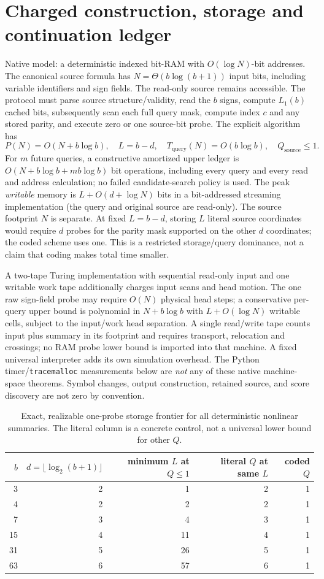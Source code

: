 \documentclass[10pt]{article}
\begin{document}
\section{Charged construction, storage and continuation ledger}
Native model: a deterministic indexed bit-RAM with $O(\log N)$-bit addresses. The canonical source formula has $N=\Theta(b\log(b+1))$ input bits, including variable identifiers and sign fields. The read-only source remains accessible. The protocol must parse source structure/validity, read the $b$ signs, compute $L_1(b)$ cached bits, subsequently scan each full query mask, compute index $c$ and any stored parity, and execute zero or one source-bit probe. The explicit algorithm has
\[
P(N)=O(N+b\log b),\quad L=b-d,\quad
T_{\mathrm{query}}(N)=O(b\log b),\quad Q_{\mathrm{source}}\le1.
\]
For $m$ future queries, a constructive amortized upper ledger is $O(N+b\log b+mb\log b)$ bit operations, including every query and every read and address calculation; no failed candidate-search policy is used. The peak \emph{writable} memory is $L+O(d+\log N)$ bits in a bit-addressed streaming implementation (the query and original source are read-only). The source footprint $N$ is separate. At fixed $L=b-d$, storing $L$ literal source coordinates would require $d$ probes for the parity mask supported on the other $d$ coordinates; the coded scheme uses one. This is a restricted storage/query dominance, not a claim that coding makes total time smaller.

A two-tape Turing implementation with sequential read-only input and one writable work tape additionally charges input scans and head motion. The one raw sign-field probe may require $O(N)$ physical head steps; a conservative per-query upper bound is polynomial in $N+b\log b$ with $L+O(\log N)$ writable cells, subject to the input/work head separation. A single read/write tape counts input plus summary in its footprint and requires transport, relocation and crossings; no RAM probe lower bound is imported into that machine. A fixed universal interpreter adds its own simulation overhead. The Python timer/\texttt{tracemalloc} measurements below are \emph{not} any of these native machine-space theorems. Symbol changes, output construction, retained source, and score discovery are not zero by convention.

\begin{table}[ht]
\centering\small
\begin{tabular}{@{}rrrrr@{}}\toprule
$b$&$d=\lfloor\log_2(b+1)\rfloor$&minimum $L$ at $Q\le1$&literal $Q$ at same $L$&coded $Q$\\\midrule
3&2&1&2&1\\
4&2&2&2&1\\
7&3&4&3&1\\
15&4&11&4&1\\
31&5&26&5&1\\
63&6&57&6&1\\\bottomrule
\end{tabular}
\caption{Exact, realizable one-probe storage frontier for all deterministic nonlinear summaries. The literal column is a concrete control, not a universal lower bound for other $Q$.}
\end{table}
\end{document}
